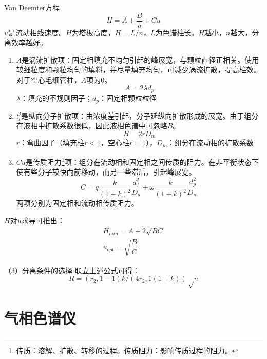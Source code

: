\begin{theorem*}{Van Deemter方程}{}
	\begin{equation*}
		H=A+\dfrac{B}{u}+Cu
	\end{equation*}
	$u$是流动相线速度。$H$为塔板高度，$H=L/n$，$L$为色谱柱长。$H$越小，$n$越大，分离效率越好。
\end{theorem*}

\begin{enumerate}
	\item $A$是涡流扩散项：固定相填充不均匀引起的峰展宽，与颗粒直径正相关。使用较细粒度和颗粒均匀的填料，并尽量填充均匀，可减少涡流扩散，提高柱效。对于空心毛细管柱，$A$项为$0$。
	\begin{equation*}
		A=2\lambda d_p
	\end{equation*}
	$\lambda$：填充的不规则因子；$d_p$：固定相颗粒粒径
	\item $\frac{B}{u}$是纵向分子扩散项：由浓度差引起，分子延纵向扩散形成的展宽。由于组分在液相中扩散系数很低，因此液相色谱中可忽略$B$。
	\begin{equation*}
		B=2rD_m
	\end{equation*}
	$r$：弯曲因子（填充柱$r<1$，空心柱$r=1$），$D_m$：组分在流动相的扩散系数
	\item $Cu$是传质阻力\footnote{传质：溶解、扩散、转移的过程。传质阻力：影响传质过程的阻力。}项：组分在流动相和固定相之间传质的阻力。在非平衡状态下使有些分子较快向前移动，而另一些滞后，引起峰展宽。
	\begin{equation*}
		C=q\dfrac{k}{(1+k)^2}\dfrac{d_f^2}{D_s}+\omega\dfrac{k}{(1+k)^2}\dfrac{d_p^2}{D_m}
	\end{equation*}
	两项分别为固定相和流动相传质阻力。
\end{enumerate}

$H$对$u$求导可推出：
\begin{gather*}
	H_{min}=A+2\sqrt{BC}\\
	u_{opt}=\sqrt{\dfrac{B}{C}}
\end{gather*}

（3）分离条件的选择
联立上述公式可得：
\begin{equation*}
	R=(r_2,1-1)k/(4r_2,1 (1+k)) √n
\end{equation*}










\section{气相色谱仪}
